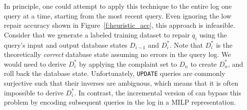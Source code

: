 \begin{description}[leftmargin=0mm, topsep=0mm, itemsep=0mm, parsep=1mm]
\item [Single Query Limitation. ]
In principle, one could attempt to apply this technique to the
entire log one query at a time, starting from the most recent query.
Even ignoring the low repair accuracy shown in Figure~\ref{f:heuristic_acc},
this approach is infeasible.
Consider that we generate a labeled training dataset to repair $q_i$ 
using the query's input and output database states $D_{i-1}$ and $D_i^*$.
Note that $D_i^*$ is the theoretically \emph{correct} database state assuming no errors in the query log.
We would need to derive $D_i^*$ by applying the complaint set to $D_n$ to create $D_n^*$, and roll back the database state.
Unfortunately, \texttt{UPDATE} queries are commonly surjective such
that their inverses are ambiguous, which means that it is often
impossible to derive $D_i^*$. In contrast, the incremental version of
\sys can bypass this problem by encoding subsequent queries in the log
in a MILP representation.


\end{description}
